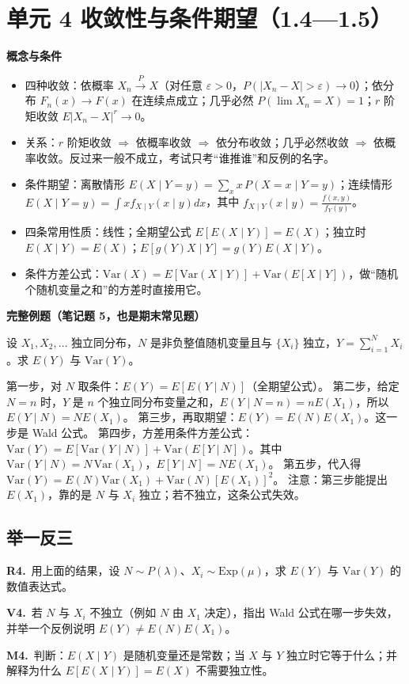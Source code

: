 \documentclass[UTF8,a4paper,11pt]{ctexart}
\newcommand{\PracticeQuestion}[3]{\par\Needspace{4\baselineskip}\noindent\begin{minipage}{\linewidth}\textbf{#1.}\ #2\par\noindent\rule{0pt}{#3mm}\par\end{minipage}\par}
\begin{document}
\section{单元 4 收敛性与条件期望（1.4—1.5）}
\textbf{概念与条件}

\begin{itemize}
\item 四种收敛：依概率 $X_n\xrightarrow{P}X$（对任意 $\varepsilon>0$，$P(|X_n-X|>\varepsilon)\to0$）；依分布 $F_n(x)\to F(x)$ 在连续点成立；几乎必然 $P(\lim X_n=X)=1$；$r$ 阶矩收敛 $E|X_n-X|^r\to0$。
\item 关系：$r$ 阶矩收敛 $\Rightarrow$ 依概率收敛 $\Rightarrow$ 依分布收敛；几乎必然收敛 $\Rightarrow$ 依概率收敛。反过来一般不成立，考试只考“谁推谁”和反例的名字。
\item 条件期望：离散情形 $E(X\mid Y=y)=\sum_x x\,P(X=x\mid Y=y)$；连续情形 $E(X\mid Y=y)=\int x f_{X\mid Y}(x\mid y)dx$，其中 $f_{X\mid Y}(x\mid y)=\frac{f(x,y)}{f_Y(y)}$。
\item 四条常用性质：线性；全期望公式 $E[E(X\mid Y)]=E(X)$；独立时 $E(X\mid Y)=E(X)$；$E[g(Y)X\mid Y]=g(Y)E(X\mid Y)$。
\item 条件方差公式：$\mathrm{Var}(X)=E[\mathrm{Var}(X\mid Y)]+\mathrm{Var}(E[X\mid Y])$，做“随机个随机变量之和”的方差时直接用它。
\end{itemize}
\textbf{完整例题（笔记题 5，也是期末常见题）}

设 $X_1,X_2,\dots$ 独立同分布，$N$ 是非负整值随机变量且与 $\{X_i\}$ 独立，$Y=\sum_{i=1}^{N}X_i$。求 $E(Y)$ 与 $\mathrm{Var}(Y)$。

第一步，对 $N$ 取条件：$E(Y)=E[E(Y\mid N)]$（全期望公式）。 第二步，给定 $N=n$ 时，$Y$ 是 $n$ 个独立同分布变量之和，$E(Y\mid N=n)=nE(X_1)$，所以 $E(Y\mid N)=NE(X_1)$。 第三步，再取期望：$E(Y)=E(N)E(X_1)$。这一步是 Wald 公式。 第四步，方差用条件方差公式：$\mathrm{Var}(Y)=E[\mathrm{Var}(Y\mid N)]+\mathrm{Var}(E[Y\mid N])$。其中 $\mathrm{Var}(Y\mid N)=N\,\mathrm{Var}(X_1)$，$E[Y\mid N]=N E(X_1)$。 第五步，代入得 $\mathrm{Var}(Y)=E(N)\mathrm{Var}(X_1)+\mathrm{Var}(N)[E(X_1)]^2$。 注意：第三步能提出 $E(X_1)$，靠的是 $N$ 与 $X_i$ 独立；若不独立，这条公式失效。

\subsection{举一反三}
\PracticeQuestion{R4}{用上面的结果，设 $N\sim P(\lambda)$、$X_i\sim \mathrm{Exp}(\mu)$，求 $E(Y)$ 与 $\mathrm{Var}(Y)$ 的数值表达式。}{42}
\PracticeQuestion{V4}{若 $N$ 与 $X_i$ 不独立（例如 $N$ 由 $X_1$ 决定），指出 Wald 公式在哪一步失效，并举一个反例说明 $E(Y)\ne E(N)E(X_1)$。}{40}
\PracticeQuestion{M4}{判断：$E(X\mid Y)$ 是随机变量还是常数；当 $X$ 与 $Y$ 独立时它等于什么；并解释为什么 $E[E(X\mid Y)]=E(X)$ 不需要独立性。}{38}
\clearpage
{}
\end{document}
